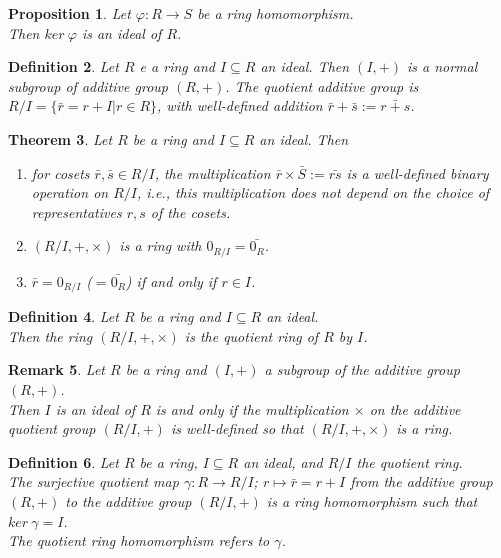 \documentclass[a4paper,sfsidenotes,openany]{tufte-book}
\theoremstyle{theorem}
\newtheorem{theorem}{Theorem}[section]
\newtheorem{proposition}[theorem]{Proposition}
\newtheorem{definition}[theorem]{Definition}
\newtheorem{remark}[theorem]{Remark}
\begin{document}
\begin{fullwidth}
\begin{proposition}
Let $\varphi: R \rightarrow S$ be a ring homomorphism.\\
Then $ker \ \varphi$ is an ideal of $R$.\\
\end{proposition}
\>

\begin{definition}
Let $R$ e a ring and $I \subseteq R$ an ideal. Then $(I, +)$ is a normal subgroup of additive group $(R, +)$. The \textit{{\color{blue} quotient additive group}} is $R/I = \{\bar{r} = r + I | r \in R\}$, with well-defined addition $\bar{r} + \bar{s} := \bar{r+s}$.\\
\end{definition}
\>

\begin{theorem}
Let $R$ be a ring and $I \subseteq R$ an ideal. Then
\begin{enumerate}[label=(\roman*),leftmargin=0pt, itemindent=4em, align=left]
\item for cosets $\bar{r}, \bar{s} \in R/I$, the multiplication $\bar{r} \times \bar{S} := \bar{rs}$ is a well-defined binary operation on $R/I$, i.e., this multiplication does not depend on the choice of representatives $r, s$ of the cosets.
\item $(R/I, +, \times)$ is a ring with $0_{R/I} = \bar{0_R}$.
\item $\bar{r} = 0_{R/I}$ ($=\bar{0_R}$) if and only if $r \in I$.
\end{enumerate}
\end{theorem}
\>

\begin{definition}
Let $R$ be a ring and $I \subseteq R$ an ideal.\\
Then the ring $(R/I, +, \times)$ is the \textit{{\color{blue} quotient ring}} of $R$ by $I$.\\
\end{definition}
\>

\begin{remark}
Let $R$ be a ring and $(I, +)$ a subgroup of the additive group $(R, +)$.\\
Then $I$ is an ideal of $R$ is and only if the multiplication $\times$ on the additive quotient group $(R/I, +)$ is well-defined so that $(R/I, +, \times)$ is a ring.\\	
\end{remark}
\>

\begin{definition}
Let $R$ be a ring, $I \subseteq R$ an ideal, and $R/I$ the quotient ring.\\
The \textit{{\color{blue} surjective quotient map}} $\gamma: R \rightarrow R/I$; $r \mapsto \bar{r} = r + I$ from the additive group $(R, +)$ to the additive group $(R/I, +)$ is a ring homomorphism such that $ker \ \gamma = I$.\\
The \textit{{\color{blue} quotient ring homomorphism}} refers to $\gamma$.\\
\end{definition}
\>


\end{fullwidth}
\end{document}
